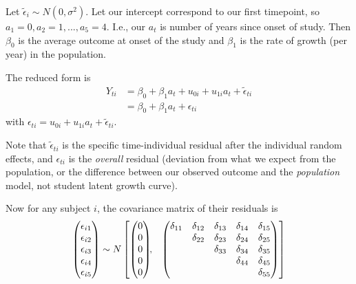 \documentclass[
  letterpaper,
  DIV=11,
  numbers=noendperiod]{scrreprt}
\begin{document}
Let \(\tilde{\epsilon}_i \sim N(0, \sigma^2)\). Let our intercept
correspond to our first timepoint, so
\(a_1 = 0, a_2 = 1, ..., a_5 = 4\). I.e., our \(a_t\) is number of years
since onset of study. Then \(\beta_{0}\) is the average outcome at onset
of the study and \(\beta_{1}\) is the rate of growth (per year) in the
population.

The reduced form is \[\begin{aligned}
 Y_{ti} &= \beta_{0}  + \beta_{1}  a_t  + u_{0i} + u_{1i} a_t + \tilde{\epsilon}_{ti} \\ 
 &= \beta_{0}  + \beta_{1}  a_t  + \epsilon_{ti} 
\end{aligned}\] with
\(\epsilon_{ti} = u_{0i} + u_{1i} a_t + \tilde{\epsilon}_{ti}\).

Note that \(\tilde{\epsilon}_{ti}\) is the specific time-individual
residual after the individual random effects, and \(\epsilon_{ti}\) is
the \emph{overall} residual (deviation from what we expect from the
population, or the difference between our observed outcome and the
\emph{population} model, not student latent growth curve).

Now for any subject \(i\), the covariance matrix of their residuals is
\[\begin{aligned}
\begin{pmatrix} \epsilon_{i1} \\
\epsilon_{i2} \\
\epsilon_{i3} \\
\epsilon_{i4} \\
\epsilon_{i5}
\end{pmatrix} &\sim  N
\begin{bmatrix}
\begin{pmatrix}
0 \\
0 \\
0\\
0 \\
0
\end{pmatrix}\!\!,&
\begin{pmatrix}
\delta_{11} & \delta_{12} & \delta_{13} & \delta_{14} & \delta_{15} \\
           & \delta_{22} & \delta_{23} & \delta_{24} & \delta_{25} \\
         &              & \delta_{33} & \delta_{34} & \delta_{35} \\
         &              &             & \delta_{44} & \delta_{45} \\
         &              &              &            & \delta_{55} 
\end{pmatrix}
\end{bmatrix}\\[2\jot]
\end{aligned}\]
\end{document}
